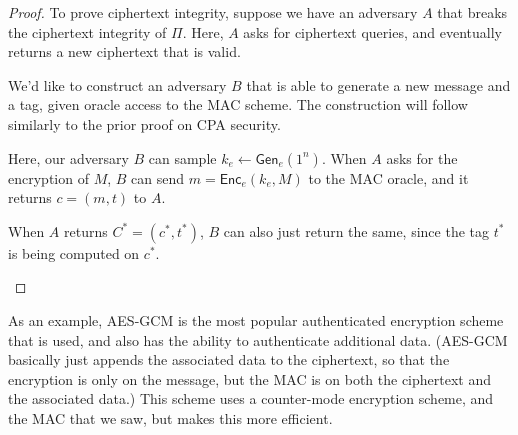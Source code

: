 \begin{proof}
    To prove ciphertext integrity, suppose we have an adversary $A$ that breaks the ciphertext integrity of $\Pi$. Here, $A$ asks for ciphertext queries, and eventually returns a new ciphertext that is valid.

    We'd like to construct an adversary $B$ that is able to generate a new message and a tag, given oracle access to the MAC scheme. The construction will follow similarly to the prior proof on CPA security.

    Here, our adversary $B$ can sample $k_e \gets \mathsf{Gen}_e(1^n)$. When $A$ asks for the encryption of $M$, $B$ can send $m = \mathsf{Enc}_e(k_e, M)$ to the MAC oracle, and it returns $c = (m, t)$ to $A$.

    When $A$ returns $C^* = (c^*, t^*)$, $B$ can also just return the same, since the tag $t^*$ is being computed on $c^*$.

    \begin{center}
    \end{center}
\end{proof}

As an example, AES-GCM is the most popular authenticated encryption scheme that is used, and also has the ability to authenticate additional data. (AES-GCM basically just appends the associated data to the ciphertext, so that the encryption is only on the message, but the MAC is on both the ciphertext and the associated data.) This scheme uses a counter-mode encryption scheme, and the MAC that we saw, but makes this more efficient.

